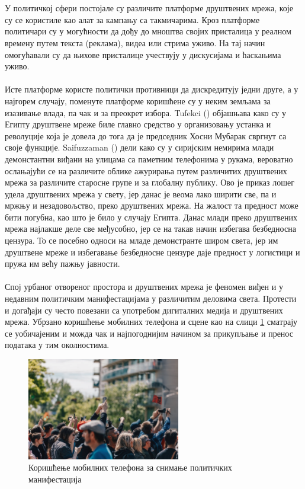\documentclass{article}
\begin{document}
\\\\
У политичкој сфери постојале су различите платформе друштвених мрежа, које су се користиле као алат за кампању са такмичарима. Кроз платформе политичари су у могућности да дођу до мноштва својих присталица у реалном времену путем текста (реклама), видеа или стрима уживо. На тај начин омогућавали су да њихове присталице учествују у дискусијама и ћаскањима уживо. 
\\\\
Исте платформе користе политички противници да дискредитују једни друге, а у најгорем случају, поменуте платформе коришћене су у неким земљама за изазивање влада, па чак и за преокрет избора. Tufekci (\cite{tu_2014}) објашњава како су у Египту друштвене мреже биле главно средство у организовању устанка и револуције која је довела до тога да је председник Хосни Мубарак свргнут са своје функције. Saifuzzaman (\cite{s_2017}) дели како су у сиријским немирима млади демонстантни виђани на улицама са паметним телефонима у рукама, вероватно ослањајући се на различите облике ажурирања путем различитих друштвених мрежа за различите старосне групе и за глобалну публику. Ово је приказ лошег удела друштвених мрежа у свету, јер данас је веома лако ширити све, па и мржњу и незадовољство, преко друштвених мрежа. На жалост та предност може бити погубна, као што је било у случају Египта. Данас млади преко друштвених мрежа најлакше деле све међусобно, јер се на такав начин избегава безбедносна цензура. То се посебно односи на младе демонстранте широм света, јер им друштвене мреже и избегавање безбедносне цензуре даје предност у логистици и пружа им већу пажњу јавности.
\\\\
Спој урбаног отвореног простора и друштвених мрежа је феномен виђен и у недавним политичким манифестацијама у различитим деловима света. Протести и догађаји су често повезани са употребом дигиталних медија и друштвених мрежа. Убрзано коришћење мобилних телефона и сцене као на слици \ref{fig:mreze2} сматрају се уобичајеним и можда чак и најпогоднијим начином за прикупљање и пренос података у тим околностима.\\
\begin{figure}[h!]
\centering
\includegraphics[width=0.6\textwidth]{slike/mreze2.png}
\caption{\label{fig:mreze2}Коришћење мобилних телефона за снимање политичких манифестација}
\end{figure}
\end{document}
